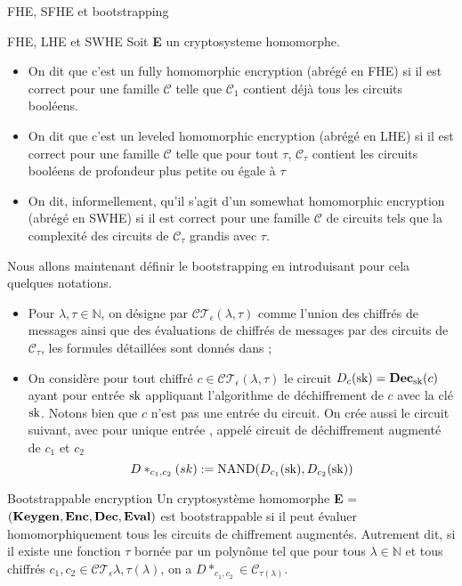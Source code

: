 \begin{section}{FHE, SFHE et bootstrapping}
\begin{definition}{FHE, LHE et SWHE}
Soit \textbf{E} un cryptosysteme homomorphe.
\begin{itemize}
\item On dit que c'est un fully homomorphic encryption (abrégé en FHE) si il est correct pour
une famille $\mathcal{C}$ telle que $\mathcal{C_1}$ contient déjà tous les
circuits booléens. 
\item On dit que c'est un  leveled homomorphic encryption (abrégé en LHE)  si il est correct pour une famille
$\mathcal{C}$ telle que pour tout $\tau$, $\mathcal{C}_\tau$ contient les
circuits booléens de profondeur plus petite ou égale à $\tau$ 
\item On dit, informellement, qu'il s'agit d'un somewhat homomorphic encryption
(abrégé en SWHE) si il est correct pour une famille $\mathcal{C}$ de circuits
tels que la complexité des circuits de $\mathcal{C}_\tau$ grandis avec $\tau$.
\end{itemize}
\end{definition}

Nous allons maintenant définir le bootstrapping en introduisant pour cela
quelques notations.

\begin{itemize}
\item Pour $\lambda, \tau \in \mathbb{N}$, on désigne par
$\mathcal{CT}_\epsilon(\lambda,\tau)$ comme l'union des chiffrés de messages 
ainsi que des évaluations de chiffrés de messages par des circuits de
$\mathcal{C}_\tau$, les formules détaillées sont donnés dans \cite{halevi};
\item On considère pour tout chiffré $c\in\mathcal{CT}_\epsilon(\lambda,\tau)$ 
le circuit $D_c(\text{sk}) = \text{\textbf{Dec}}_{\text{sk}}(c)$ ayant pour entrée $\text{sk}$ appliquant 
l'algorithme de déchiffrement de $c$ avec la clé $\text{sk}$. Notons bien que $c$
n'est pas une entrée du circuit. On crée aussi le circuit suivant, avec pour
unique entrée \sk, appelé circuit de déchiffrement augmenté de $c_1$ et $c_2$
\[ D*_{c_1,c_2}(sk) := \text{NAND}(D_{c_1}(\text{sk}), D_{c_2}(\text{sk}))\]
\end{itemize}

\begin{definition}{Bootstrappable encryption}
Un cryptosystème homomorphe
\textbf{E} = $(\text{\textbf{Keygen}}, \text{\textbf{Enc}}, \text{\textbf{Dec}}, \text{\textbf{Eval}})$
est bootstrappable si il peut évaluer homomorphiquement tous les circuits 
de chiffrement augmentés. Autrement dit, si il existe une fonction $\tau$
bornée par un polynôme tel que pour tous $\lambda \in \mathbb{N}$ et tous
chiffrés  $c_1, c_2 \in \mathcal{CT}_\epsilon{\lambda, \tau(\lambda)}$, on a
$D*_{c_1,c_2} \in \mathcal{C}_{\tau(\lambda)}$.
\end{definition}


\end{section}
